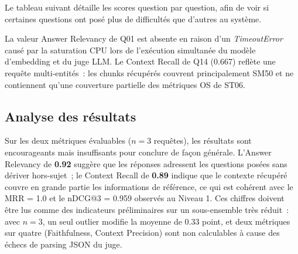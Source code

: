 Le tableau suivant détaille les scores question par question, afin de voir si certaines questions ont posé plus de difficultés que d'autres au système.

\begin{table}[H]
\centering
\caption{Résultats RAGAS détaillés par requête}
\label{tab:ragas-per-query}
\end{table}

La valeur Answer Relevancy de Q01 est absente en raison d'un \textit{TimeoutError}
causé par la saturation CPU lors de l'exécution simultanée du modèle d'embedding et du juge LLM.
Le Context Recall de Q14 (0.667) reflète une requête multi-entités~: les chunks récupérés
couvrent principalement SM50 et ne contiennent qu'une couverture partielle des métriques OS de ST06.

\subsection{Analyse des résultats}

Sur les deux métriques évaluables ($n = 3$ requêtes), les résultats sont encourageants mais insuffisants pour conclure de façon générale. L'Answer Relevancy de \textbf{0.92} suggère que les réponses adressent les questions posées sans dériver hors-sujet~; le Context Recall de \textbf{0.89} indique que le contexte récupéré couvre en grande partie les informations de référence, ce qui est cohérent avec le MRR = 1.0 et le nDCG@3 = 0.959 observés au Niveau 1. Ces chiffres doivent être lus comme des indicateurs préliminaires sur un sous-ensemble très réduit~: avec $n = 3$, un seul outlier modifie la moyenne de 0.33 point, et deux métriques sur quatre (Faithfulness, Context Precision) sont non calculables à cause des échecs de parsing JSON du juge.

